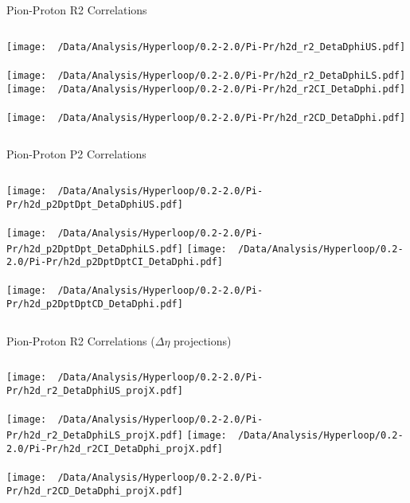 \documentclass{beamer}
\begin{document}
\begin{frame}{Pion-Proton R2 Correlations}
	\begin{columns}
		\centering
		\texttt{[image: ~/Data/Analysis/Hyperloop/0.2-2.0/Pi-Pr/h2d\_r2\_DetaDphiUS.pdf]}\\~\\
		\texttt{[image: ~/Data/Analysis/Hyperloop/0.2-2.0/Pi-Pr/h2d\_r2\_DetaDphiLS.pdf]}
		\centering
		\texttt{[image: ~/Data/Analysis/Hyperloop/0.2-2.0/Pi-Pr/h2d\_r2CI\_DetaDphi.pdf]}\\~\\
		\texttt{[image: ~/Data/Analysis/Hyperloop/0.2-2.0/Pi-Pr/h2d\_r2CD\_DetaDphi.pdf]}
	\end{columns}
\end{frame}
\begin{frame}{Pion-Proton P2 Correlations}
	\begin{columns}
		\column{0.5\linewidth}
		\centering
		\texttt{[image: ~/Data/Analysis/Hyperloop/0.2-2.0/Pi-Pr/h2d\_p2DptDpt\_DetaDphiUS.pdf]}\\~\\
		\texttt{[image: ~/Data/Analysis/Hyperloop/0.2-2.0/Pi-Pr/h2d\_p2DptDpt\_DetaDphiLS.pdf]}
		\column{0.5\linewidth}
		\centering
		\texttt{[image: ~/Data/Analysis/Hyperloop/0.2-2.0/Pi-Pr/h2d\_p2DptDptCI\_DetaDphi.pdf]}\\~\\
		\texttt{[image: ~/Data/Analysis/Hyperloop/0.2-2.0/Pi-Pr/h2d\_p2DptDptCD\_DetaDphi.pdf]}
	\end{columns}
\end{frame}
\begin{frame}{Pion-Proton R2 Correlations ($\Delta\eta$ projections)}
	\begin{columns}
		\centering
		\texttt{[image: ~/Data/Analysis/Hyperloop/0.2-2.0/Pi-Pr/h2d\_r2\_DetaDphiUS\_projX.pdf]}\\~\\
		\texttt{[image: ~/Data/Analysis/Hyperloop/0.2-2.0/Pi-Pr/h2d\_r2\_DetaDphiLS\_projX.pdf]}
		\centering
		\texttt{[image: ~/Data/Analysis/Hyperloop/0.2-2.0/Pi-Pr/h2d\_r2CI\_DetaDphi\_projX.pdf]}\\~\\
		\texttt{[image: ~/Data/Analysis/Hyperloop/0.2-2.0/Pi-Pr/h2d\_r2CD\_DetaDphi\_projX.pdf]}
	\end{columns}
\end{frame}
\end{document}
